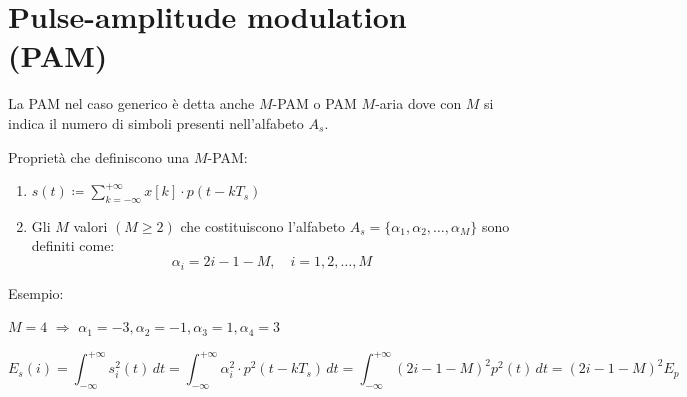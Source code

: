 \section*{Pulse-amplitude modulation (PAM)}

La PAM nel caso generico è detta anche \( M \)-PAM o PAM \( M \)-aria dove con \( M \) si indica il numero di simboli presenti nell'alfabeto \( A_s \).

\begin{center}
\end{center}

Proprietà che definiscono una \( M \)-PAM:

\begin{enumerate}
    \item \( s(t) \coloneqq \sum_{k=-\infty}^{+\infty} x[k]\cdot p(t - kT_s) \)
    \item Gli \( M \) valori \( (M \geq 2) \) che costituiscono l'alfabeto \( A_s = \{ \alpha_1, \alpha_2, \ldots, \alpha_M \} \) sono definiti come:
          \[ \alpha_i = 2i - 1 - M, \quad i = 1, 2, \ldots, M \]
\end{enumerate}

Esempio:

\( M=4 \) $\Rightarrow$ \( \alpha_1 = -3, \alpha_2 = -1, \alpha_3 = 1, \alpha_4 = 3 \)

\begin{center}
\end{center}
\[
    E_s(i) = \int_{-\infty}^{+\infty} s_i^2(t) \, dt =  \int_{-\infty}^{+\infty} \alpha_i^2 \cdot p^2(t - kT_s) \, dt = \int_{-\infty}^{+\infty} (2i - 1 - M)^2 p^2(t) \, dt = (2i - 1 - M)^2 E_p
\]

